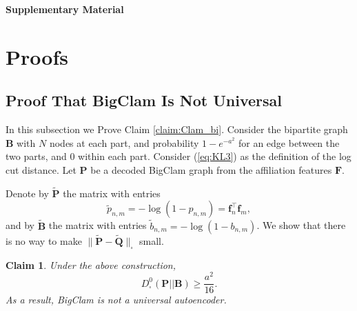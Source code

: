 \documentclass[letterpaper]{article} %
\newtheorem{claim}[theorem]{Claim}
\begin{document}
\clearpage

\appendix

\begin{center}
{\huge \textbf{Supplementary Material}}


\end{center}

\section{Proofs}

\subsection{Proof That BigClam Is Not Universal}
\label{Proof That BigClam Is Not Universal}
In this subsection we Prove Claim \ref{claim:Clam_bi}. 
Consider the bipartite graph $\mathbf{B}$ with $N$ nodes at each part, and probability $1-e^{-a^2}$ for an edge between the two parts, and $0$ within each part. Consider (\ref{eq:KL3}) as the definition of the log cut distance. Let $\mathbf{P}$ be a decoded BigClam graph from the affiliation features $\mathbf{F}$.

Denote by $\tilde{\mathbf{P}}$ the matrix with entries 
\[\tilde{p}_{n,m}=-\log(1-p_{n,m})=\mathbf{f}_n^\top\mathbf{f}_m,\] 
and by $\tilde{\mathbf{B}}$ the matrix  with entries $\tilde{b}_{n,m}=-\log(1-b_{n,m})$.
We show that there is no way to make $\| \tilde{\mathbf{P}}-\tilde{\mathbf{Q}}\|_{\square}$ small.

\begin{claim}
    Under the above construction, 
    \[D^0_{\square}(\mathbf{P} || \mathbf{B}) \geq \frac{a^2}{16}.\]
    As a result, BigClam is not a universal autoencoder.
\end{claim}
\end{document}
